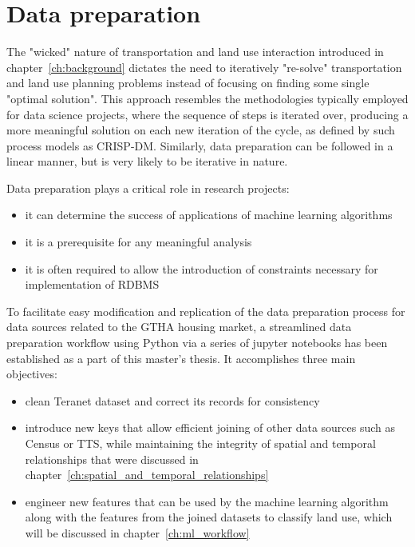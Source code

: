 \chapter{Data preparation} \label{ch:data_preparation}

The "wicked" nature of transportation and land use interaction introduced in chapter~\ref{ch:background} dictates the need to iteratively "re-solve" transportation and land use planning problems instead of focusing on finding some single "optimal solution".
This approach resembles the methodologies typically employed for data science projects, where the sequence of steps is iterated over, producing a more meaningful solution on each new iteration of the cycle, as defined by such process models as CRISP-DM\cite{Shearer2000}.
Similarly, data preparation can be followed in a linear manner, but is very likely to be iterative in nature\cite{Brownlee2013}.

\vspace{5mm}

Data preparation plays a critical role in research projects:

\begin{itemize}
    \item it can determine the success of applications of machine learning algorithms
    \item it is a prerequisite for any meaningful analysis
    \item it is often required to allow the introduction of constraints necessary for implementation of RDBMS
\end{itemize}

\vspace{5mm}

To facilitate easy modification and replication of the data preparation process for data sources related to the GTHA housing market, a streamlined data preparation workflow using Python via a series of jupyter notebooks has been established as a part of this master's thesis.
It accomplishes three main objectives:
\begin{itemize}
    \item clean Teranet dataset and correct its records for consistency
    \item introduce new keys that allow efficient joining of other data sources such as Census or TTS, while maintaining the integrity of spatial and temporal relationships that were discussed in chapter~\ref{ch:spatial_and_temporal_relationships}
    \item engineer new features that can be used by the machine learning algorithm along with the features from the joined datasets to classify land use, which will be discussed in chapter~\ref{ch:ml_workflow}
\end{itemize}

